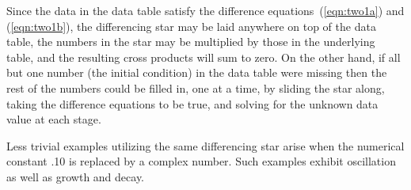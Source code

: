\par
Since the data in the data table satisfy the difference 
equations~(\ref{eqn:two1a}) and (\ref{eqn:two1b}),
the differencing star may be laid anywhere on top of the data table,
the numbers in the star may be multiplied
by those in the underlying table,
and the resulting cross products will sum to zero.
On the other hand, if all but one number (the initial condition) in the
data table were missing then the rest of the numbers could be filled in, 
one at a time, by sliding the star along, taking the difference
equations to be true, and solving for the unknown data value at each
stage.
\par
Less trivial examples utilizing the same differencing star arise when
the numerical constant .10 is replaced by a complex number.
Such examples exhibit oscillation as well as growth and decay.
